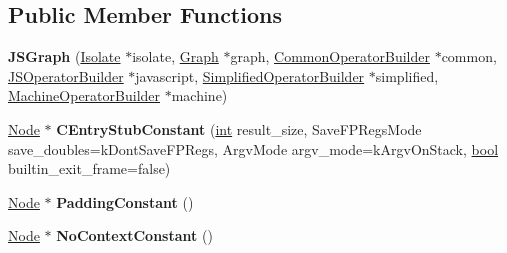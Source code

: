 \subsection*{Public Member Functions}
\begin{DoxyCompactItemize}
\item 
\mbox{\label{classv8_1_1internal_1_1compiler_1_1JSGraph_ab86eb832ed84711836a88ce93d33f51f}} 
{\bfseries J\+S\+Graph} (\mbox{\hyperlink{classv8_1_1internal_1_1Isolate}{Isolate}} $\ast$isolate, \mbox{\hyperlink{classv8_1_1internal_1_1compiler_1_1Graph}{Graph}} $\ast$graph, \mbox{\hyperlink{classv8_1_1internal_1_1compiler_1_1CommonOperatorBuilder}{Common\+Operator\+Builder}} $\ast$common, \mbox{\hyperlink{classv8_1_1internal_1_1compiler_1_1JSOperatorBuilder}{J\+S\+Operator\+Builder}} $\ast$javascript, \mbox{\hyperlink{classv8_1_1internal_1_1compiler_1_1SimplifiedOperatorBuilder}{Simplified\+Operator\+Builder}} $\ast$simplified, \mbox{\hyperlink{classv8_1_1internal_1_1compiler_1_1MachineOperatorBuilder}{Machine\+Operator\+Builder}} $\ast$machine)
\item 
\mbox{\label{classv8_1_1internal_1_1compiler_1_1JSGraph_a0bd44651b5e363d44d8c551c572b17c8}} 
\mbox{\hyperlink{classv8_1_1internal_1_1compiler_1_1Node}{Node}} $\ast$ {\bfseries C\+Entry\+Stub\+Constant} (\mbox{\hyperlink{classint}{int}} result\+\_\+size, Save\+F\+P\+Regs\+Mode save\+\_\+doubles=k\+Dont\+Save\+F\+P\+Regs, Argv\+Mode argv\+\_\+mode=k\+Argv\+On\+Stack, \mbox{\hyperlink{classbool}{bool}} builtin\+\_\+exit\+\_\+frame=false)
\item 
\mbox{\label{classv8_1_1internal_1_1compiler_1_1JSGraph_a57bd6100acc2e0bdfa8b6c128be63a9f}} 
\mbox{\hyperlink{classv8_1_1internal_1_1compiler_1_1Node}{Node}} $\ast$ {\bfseries Padding\+Constant} ()
\item 
\mbox{\label{classv8_1_1internal_1_1compiler_1_1JSGraph_a3174978f25c8e0a6d0663c23ec15c737}} 
\mbox{\hyperlink{classv8_1_1internal_1_1compiler_1_1Node}{Node}} $\ast$ {\bfseries No\+Context\+Constant} ()
\item 
\mbox{\label{classv8_1_1internal_1_1compiler_1_1JSGraph_af9becafdae6ec10310deedbb379296e7}} 

\end{DoxyCompactItemize}
